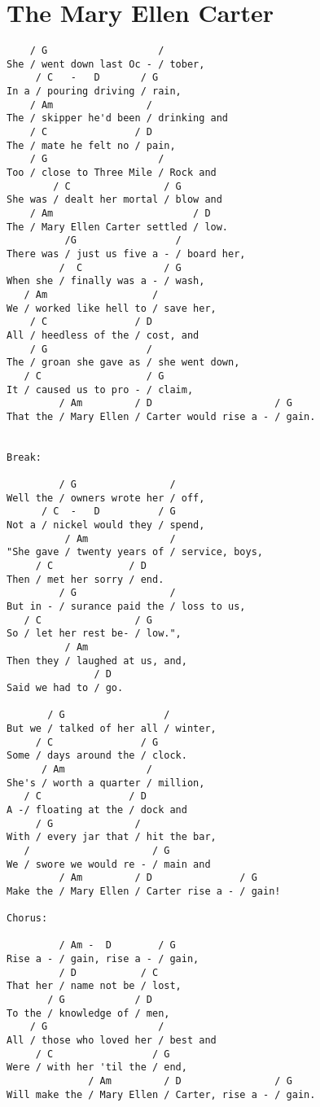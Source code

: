 \documentclass[leqno]{memoir}
\begin{document}
\chapter{The Mary Ellen Carter}
\begin{verbatim}
    / G                   /
She / went down last Oc - / tober,
     / C   -   D       / G
In a / pouring driving / rain,
    / Am                /
The / skipper he'd been / drinking and
    / C               / D
The / mate he felt no / pain,
    / G                   /
Too / close to Three Mile / Rock and
        / C                / G
She was / dealt her mortal / blow and
    / Am                        / D
The / Mary Ellen Carter settled / low.
          /G                 /
There was / just us five a - / board her,
         /  C              / G
When she / finally was a - / wash,
   / Am                  /
We / worked like hell to / save her,
    / C               / D
All / heedless of the / cost, and
    / G                 /
The / groan she gave as / she went down,
   / C                  / G
It / caused us to pro - / claim,
         / Am         / D                     / G
That the / Mary Ellen / Carter would rise a - / gain.


Break:

         / G                /
Well the / owners wrote her / off,
      / C  -   D          / G
Not a / nickel would they / spend,
          / Am              /
"She gave / twenty years of / service, boys,
     / C             / D
Then / met her sorry / end.
         / G                /
But in - / surance paid the / loss to us,
   / C                / G
So / let her rest be- / low.",
          / Am
Then they / laughed at us, and,
               / D
Said we had to / go.

       / G                 /
But we / talked of her all / winter,
     / C               / G
Some / days around the / clock.
      / Am              /
She's / worth a quarter / million,
   / C               / D
A -/ floating at the / dock and
     / G              /
With / every jar that / hit the bar,
   /                     / G
We / swore we would re - / main and
         / Am         / D               / G
Make the / Mary Ellen / Carter rise a - / gain!

Chorus:

         / Am -  D        / G
Rise a - / gain, rise a - / gain,
         / D           / C
That her / name not be / lost,
       / G            / D
To the / knowledge of / men,
    / G                   /
All / those who loved her / best and
     / C                 / G
Were / with her 'til the / end,
              / Am         / D                / G
Will make the / Mary Ellen / Carter, rise a - / gain.



\end{verbatim}
\end{document}
